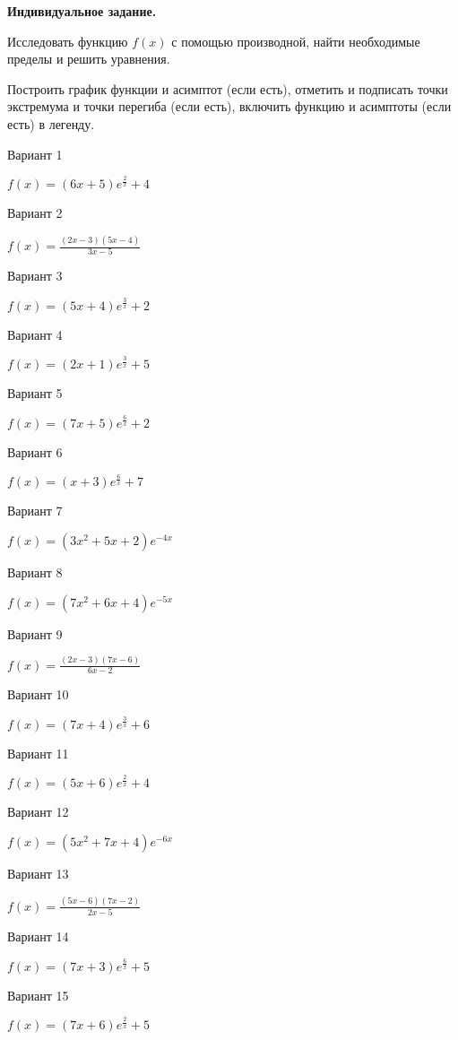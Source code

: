\documentclass[11pt]{report}
\begin{document}
\pagestyle{empty}

{\bf Индивидуальное задание.}

 
Исследовать функцию $f(x)$ с помощью производной, найти необходимые пределы и решить уравнения.

Построить график функции и асимптот (если есть), отметить и подписать точки экстремума и точки перегиба (если есть),
включить функцию и асимптоты (если есть) в легенду. 

Вариант 1

$f(x) = \left(6 x + 5\right) e^{\frac{2}{x}} + 4$

Вариант 2

$f(x) = \frac{\left(2 x - 3\right) \left(5 x - 4\right)}{3 x - 5}$

Вариант 3

$f(x) = \left(5 x + 4\right) e^{\frac{3}{x}} + 2$

Вариант 4

$f(x) = \left(2 x + 1\right) e^{\frac{3}{x}} + 5$

Вариант 5

$f(x) = \left(7 x + 5\right) e^{\frac{6}{x}} + 2$

Вариант 6

$f(x) = \left(x + 3\right) e^{\frac{6}{x}} + 7$

Вариант 7

$f(x) = \left(3 x^{2} + 5 x + 2\right) e^{- 4 x}$

Вариант 8

$f(x) = \left(7 x^{2} + 6 x + 4\right) e^{- 5 x}$

Вариант 9

$f(x) = \frac{\left(2 x - 3\right) \left(7 x - 6\right)}{6 x - 2}$

Вариант 10

$f(x) = \left(7 x + 4\right) e^{\frac{3}{x}} + 6$

Вариант 11

$f(x) = \left(5 x + 6\right) e^{\frac{2}{x}} + 4$

Вариант 12

$f(x) = \left(5 x^{2} + 7 x + 4\right) e^{- 6 x}$

Вариант 13

$f(x) = \frac{\left(5 x - 6\right) \left(7 x - 2\right)}{2 x - 5}$

Вариант 14

$f(x) = \left(7 x + 3\right) e^{\frac{6}{x}} + 5$

Вариант 15

$f(x) = \left(7 x + 6\right) e^{\frac{2}{x}} + 5$
\end{document}
